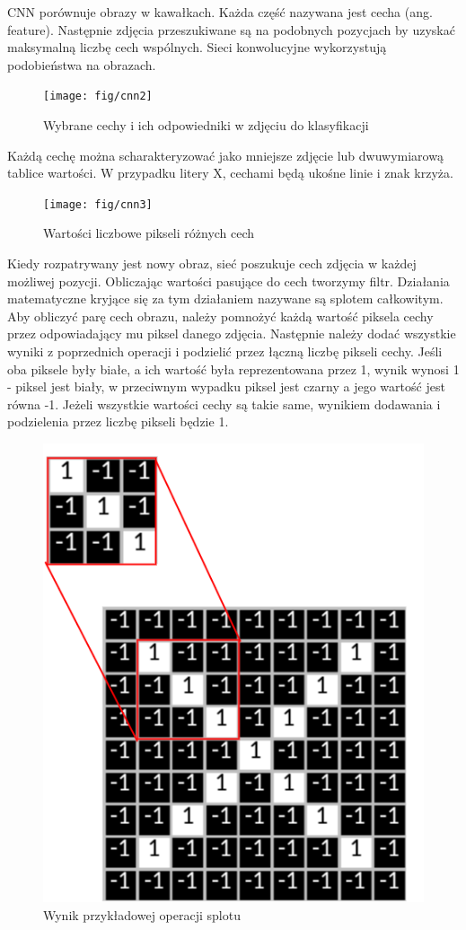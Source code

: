 \documentclass[brudnopis]{xmgr}
\begin{document}
CNN porównuje obrazy w kawałkach. Każda część nazywana jest cecha (ang. feature). Następnie zdjęcia przeszukiwane są na podobnych pozycjach by uzyskać maksymalną liczbę cech wspólnych. Sieci konwolucyjne wykorzystują podobieństwa na obrazach.
\newpage

\begin{figure}[!tbh]
\centering
\texttt{[image: fig/cnn2]}
\caption{Wybrane cechy i ich odpowiedniki w zdjęciu do klasyfikacji}
\end{figure}

Każdą cechę można scharakteryzować jako mniejsze zdjęcie lub dwuwymiarową tablice wartości. W przypadku litery X, cechami będą ukośne linie i znak krzyża.

\begin{figure}[!tbh]
\centering
\texttt{[image: fig/cnn3]}
\caption{Wartości liczbowe pikseli różnych cech}
\end{figure}
\newpage

Kiedy rozpatrywany jest nowy obraz, sieć poszukuje cech zdjęcia w każdej możliwej pozycji. Obliczając wartości pasujące do cech tworzymy filtr. Działania matematyczne kryjące się za tym działaniem nazywane są splotem całkowitym. Aby obliczyć parę cech obrazu, należy pomnożyć każdą wartość piksela cechy przez odpowiadający mu piksel danego zdjęcia. Następnie należy dodać wszystkie wyniki z poprzednich operacji i podzielić przez łączną liczbę pikseli cechy. Jeśli oba piksele były białe, a ich wartość była reprezentowana przez 1, wynik wynosi 1 - piksel jest biały, w przeciwnym wypadku piksel jest czarny a jego wartość jest równa -1. Jeżeli wszystkie wartości cechy są takie same, wynikiem dodawania i podzielenia przez liczbę pikseli będzie 1.

\begin{figure}[!tbh]
\centering
\includegraphics[width=.5\hsize]{fig/cnn4}
\caption{Wynik przykładowej operacji splotu}
\end{figure}
\newpage
\end{document}
